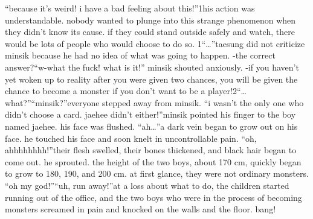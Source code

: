 “because it’s weird! i have a bad feeling about this!”1his action was understandable.
 nobody wanted to plunge into this strange phenomenon when they didn’t know its cause.
 if they could stand outside safely and watch, there would be lots of people who would choose to do so.
1“…”taesung did not criticize minsik because he had no idea of what was going to happen.
-the correct answer?“w-what the fuck! what is it!” minsik shouted anxiously.
-if you haven’t yet woken up to reality after you were given two chances, you will be given the chance to become a monster if you don’t want to be a player!2“…what?”“minsik?”everyone stepped away from minsik.
“i wasn’t the only one who didn’t choose a card.
 jaehee didn’t either!”minsik pointed his finger to the boy named jaehee.
 his face was flushed.
“ah…”a dark vein began to grow out on his face.
 he touched his face and soon knelt in uncontrollable pain.
“oh, ahhhhhhhh!”their flesh swelled, their bones thickened, and black hair began to come out.
he sprouted.
 the height of the two boys, about 170 cm, quickly began to grow to 180, 190, and 200 cm.
 at first glance, they were not ordinary monsters.
“oh my god!”“uh, run away!”at a loss about what to do, the children started running out of the office, and the two boys who were in the process of becoming monsters screamed in pain and knocked on the walls and the floor.
bang!

 